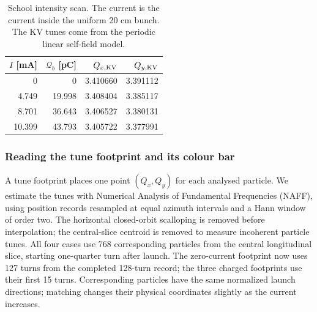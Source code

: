 \begin{table}[ht]
\centering
\caption{School intensity scan. The current is the current inside the uniform
20 cm bunch. The KV tunes come from the periodic linear self-field model.}
\begin{tabular}{@{}rrrr@{}}
\toprule
$I$ [mA] & $\mathcal Q_b$ [pC] & $Q_{x,\rm KV}$ & $Q_{y,\rm KV}$\\
\midrule
0      & 0      & 3.410660 & 3.391112\\
4.749  & 19.998 & 3.408404 & 3.385117\\
8.701  & 36.643 & 3.406527 & 3.380131\\
10.399 & 43.793 & 3.405722 & 3.377991\\
\bottomrule
\end{tabular}
\label{tab:sc-scan}
\end{table}

\subsubsection{Reading the tune footprint and its colour bar}
A tune footprint places one point $(Q_x,Q_y)$ for each analysed particle.
We estimate the tunes with Numerical Analysis of Fundamental Frequencies
(NAFF), using position records resampled at equal azimuth intervals and a
Hann window of order two. The horizontal closed-orbit scalloping is removed
before interpolation; the central-slice centroid is removed to measure
incoherent particle tunes. All four cases use 768 corresponding particles
from the central longitudinal slice, starting one-quarter turn after launch.
The zero-current footprint now uses 127 turns from the completed 128-turn
record; the three charged footprints use their first 15 turns. Corresponding
particles have the same
normalized launch directions; matching changes their physical coordinates
slightly as the current increases.

